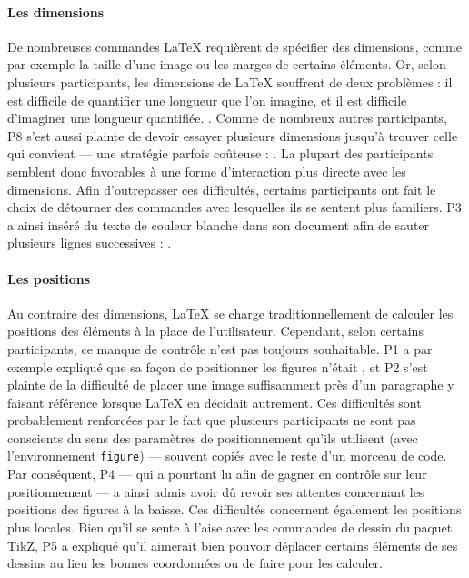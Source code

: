 \paragraph{Les dimensions}
De nombreuses commandes \LaTeX{} requièrent de spécifier des dimensions, comme par exemple la taille d'une image ou les marges de certains éléments.
Or, selon plusieurs participants, les dimensions de \LaTeX{} souffrent de deux problèmes :
il est difficile de quantifier une longueur que l'on imagine, et il est difficile d'imaginer une longueur quantifiée.
.
Comme de nombreux autres participants, P8 s'est aussi plainte de devoir essayer plusieurs dimensions jusqu'à trouver celle qui convient --- une stratégie parfois coûteuse : .
La plupart des participants semblent donc favorables à une forme d'interaction plus directe avec les dimensions.
Afin d'outrepasser ces difficultés, certains participants ont fait le choix de détourner des commandes avec lesquelles ils se sentent plus familiers.
P3 a ainsi inséré du texte de couleur blanche dans son document afin de sauter  plusieurs lignes successives : .

\paragraph{Les positions}
Au contraire des dimensions, \LaTeX{} se charge traditionnellement de calculer les positions des éléments à la place de l'utilisateur.
Cependant, selon certains participants, ce manque de contrôle n'est pas toujours souhaitable.
P1 a par exemple expliqué que sa façon de positionner les figures n'était , et P2 s'est plainte de la difficulté de placer une image suffisamment près d'un paragraphe y faisant référence lorsque \LaTeX{} en décidait autrement.
Ces difficultés sont probablement renforcées par le fait que plusieurs participants ne sont pas conscients du sens des paramètres de positionnement qu'ils utilisent (\eg avec l'environnement \texttt{figure}) --- souvent copiés avec le reste d'un morceau de code.
Par conséquent, P4 --- qui a pourtant lu  afin de gagner en contrôle sur leur positionnement --- a ainsi admis avoir dû revoir ses attentes concernant les positions des figures à la baisse.
Ces difficultés concernent également les positions plus locales.
Bien qu'il se sente à l'aise avec les commandes de dessin du paquet TikZ, P5 a expliqué qu'il aimerait bien pouvoir déplacer certains éléments de ses dessins au lieu  les bonnes coordonnées ou de faire  pour les calculer.



